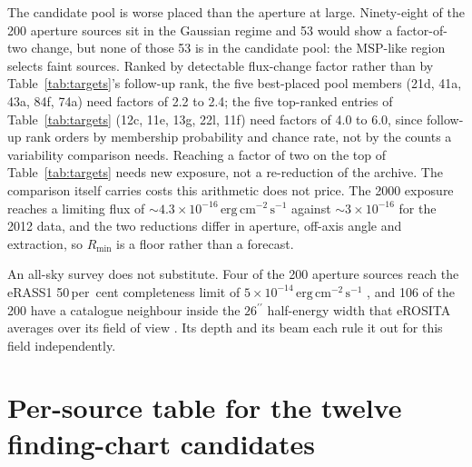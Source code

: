 \documentclass[11pt]{article}
\newcommand{\as}{\ensuremath{^{\prime\prime}}}
\begin{document}
The candidate pool is worse placed than the aperture at large. Ninety-eight of the 200
aperture sources sit in the Gaussian regime and 53 would show a factor-of-two
change, but none of those 53 is in the candidate pool: the MSP-like region selects
faint sources. Ranked by detectable flux-change factor rather than by
Table~\ref{tab:targets}'s follow-up rank, the five best-placed pool members
(21d, 41a, 43a, 84f, 74a) need factors of 2.2 to 2.4; the five top-ranked
entries of Table~\ref{tab:targets} (12c, 11e, 13g, 22l, 11f) need factors of
4.0 to 6.0, since follow-up rank orders by membership probability and chance
rate, not by the counts a variability comparison needs.
Reaching a factor of two on the top of Table~\ref{tab:targets} needs new exposure,
not a re-reduction of the archive. The comparison itself carries costs this
arithmetic does not price. The 2000 exposure reaches a limiting flux of
$\sim$$4.3\times10^{-16}\,\mathrm{erg\,cm^{-2}\,s^{-1}}$ against
$\sim$$3\times10^{-16}$ for the 2012 data, and the two reductions differ in
aperture, off-axis angle and extraction, so $R_{\min}$ is a floor rather than a
forecast.

An all-sky survey does not substitute. Four of the 200 aperture sources reach the
eRASS1 50\,per~cent completeness limit of
$5\times10^{-14}\,\mathrm{erg\,cm^{-2}\,s^{-1}}$ \citep{Merloni2024}, and 106 of
the 200 have a catalogue neighbour inside the $26\as$ half-energy width that
eROSITA averages over its field of view \citep{Predehl2021}. Its depth and its beam
each rule it out for this field independently.


\section{Per-source table for the twelve finding-chart candidates}
\label{app:twelvetable}
\end{document}
